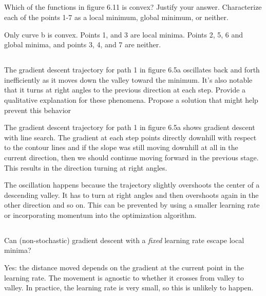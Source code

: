 \documentclass[12pt]{report}
\begin{document}
\subsection{}
\begin{mdframed}
    Which of the functions in figure 6.11 is convex? Justify your answer. Characterize each of the points 1-7 as a local minimum, global minimum, or neither.
\end{mdframed}

Only curve b is convex. Points 1, and 3 are local minima. Points 2, 5, 6 and global minima, and points 3, 4, and 7 are neither.

\subsection{}

\begin{mdframed}
    The gradient descent trajectory for path 1 in figure 6.5a oscillates back and forth ineﬀiciently as it moves down the valley toward the minimum. It’s also notable that it turns at right angles to the previous direction at each step. Provide a qualitative explanation for these phenomena. Propose a solution that might help prevent this behavior
\end{mdframed}

The gradient descent trajectory for path 1 in figure 6.5a shows gradient descent with line search. The gradient at each step points directly downhill with respect to the contour lines and if the slope was still moving downhill at all in the current direction, then we should continue moving forward in the previous stage. This results in the direction turning at right angles.

The oscillation happens because the trajectory slightly overshoots the center of a descending valley. It has to turn at right angles and then overshoots again in the other direction and so on. This can be prevented by using a smaller learning rate or incorporating momentum into the optimization algorithm.

\subsection{}
\begin{mdframed}
    Can (non-stochastic) gradient descent with a \textit{fixed} learning rate escape local minima?
\end{mdframed}

Yes: the distance moved depends on the gradient at the current point in the learning rate. The movement is agnostic to whether it crosses from valley to valley. In practice, the learning rate is very small, so this is unlikely to happen.
\end{document}
